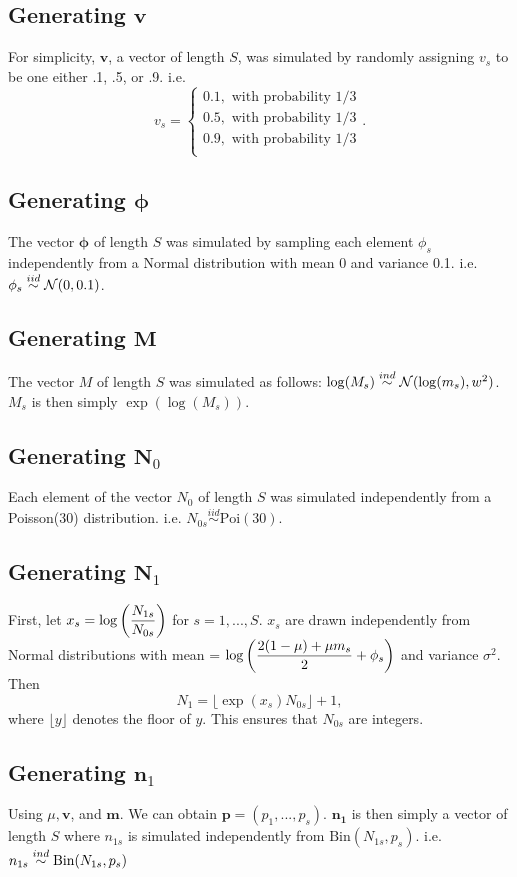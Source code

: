\documentclass[12pt]{article}
\newcommand{\Binom}{\mbox{Bin}}
\newcommand{\Poi}{\mathrm{Poi}}
\newcommand{\iid}{\stackrel{iid}{\sim}}
\begin{document}
\subsection{Generating $\bm v$}
For simplicity, $\bm v$, a vector of length $S$, was simulated by 
randomly assigning $v_s$ to be one either .1, .5, or .9. i.e. 
$$
v_s = \begin{cases} 
  0.1, \text{ with probability 1/3} \\
  0.5, \text{ with probability 1/3} \\
  0.9, \text{ with probability 1/3} \\
\end{cases}.
$$

\subsection{Generating $\bm\phi$}
The vector $\bm\phi$ of length $S$ was simulated by sampling each element
$\phi_s$ independently from a Normal distribution with mean 0 and variance
0.1. i.e. $\phi_s \iid \N(0,0.1)$.

\subsection{Generating $\bm M$}
The vector $M$ of length $S$ was simulated as follows:
$\log(M_s) \overset{ind}{\sim} \mathcal N(\log(m_s),w^2)$. $M_s$ is then simply $\exp(\log(M_s))$.
 
\subsection{Generating $\bm N_0$}
Each element of the vector $N_0$ of length $S$ was simulated independently 
from a Poisson(30) distribution. i.e. $N_{0s} \iid \Poi(30)$.

\subsection{Generating $\bm N_1$}
First, let $x_s = \log\left(\displaystyle\frac{N_{1s}}{N_{0s}}\right)$ for $s=1,...,S$.
$x_s$ are drawn independently from Normal distributions with mean = 
$\displaystyle\log\left(\frac{2(1-\mu)+\mu m_s}{2} + \phi_s\right)$ and variance $\sigma^2$.
Then 
  $$N_1 = \lfloor\exp(x_s) N_{0s}\rfloor + 1,$$
where $\lfloor y\rfloor$ denotes the floor of $y$. This ensures that $N_{0s}$
are integers.

\subsection{Generating $\bm n_1$}
Using $\mu,\bm{v}$, and $\bm{m}$. We can obtain $\bm{p} = (p_1,...,p_s)$.
$\bm{n_1}$ is then simply a vector of length $S$ where $n_{1s}$ is simulated
independently from $\Binom(N_{1s}, p_s)$. i.e. $n_{1s} \ind \Binom(N_{1s},p_s)$
\end{document}
